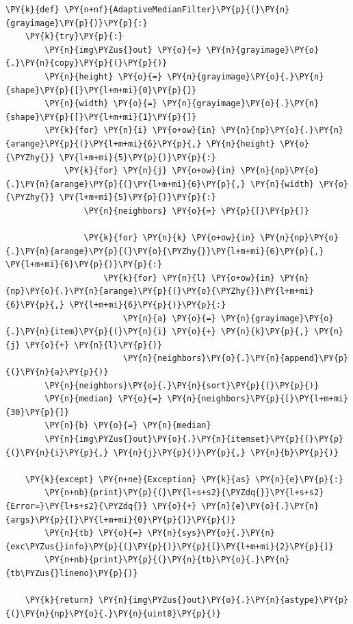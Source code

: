 \begin{tcolorbox}[breakable, size=fbox, boxrule=1pt, pad at break*=1mm,colback=cellbackground, colframe=cellborder]
	\begin{Verbatim}[commandchars=\\\{\}]
\PY{k}{def} \PY{n+nf}{AdaptiveMedianFilter}\PY{p}{(}\PY{n}{grayimage}\PY{p}{)}\PY{p}{:}
    \PY{k}{try}\PY{p}{:}
        \PY{n}{img\PYZus{}out} \PY{o}{=} \PY{n}{grayimage}\PY{o}{.}\PY{n}{copy}\PY{p}{(}\PY{p}{)}
        \PY{n}{height} \PY{o}{=} \PY{n}{grayimage}\PY{o}{.}\PY{n}{shape}\PY{p}{[}\PY{l+m+mi}{0}\PY{p}{]}
        \PY{n}{width} \PY{o}{=} \PY{n}{grayimage}\PY{o}{.}\PY{n}{shape}\PY{p}{[}\PY{l+m+mi}{1}\PY{p}{]}
        \PY{k}{for} \PY{n}{i} \PY{o+ow}{in} \PY{n}{np}\PY{o}{.}\PY{n}{arange}\PY{p}{(}\PY{l+m+mi}{6}\PY{p}{,} \PY{n}{height} \PY{o}{\PYZhy{}} \PY{l+m+mi}{5}\PY{p}{)}\PY{p}{:}
            \PY{k}{for} \PY{n}{j} \PY{o+ow}{in} \PY{n}{np}\PY{o}{.}\PY{n}{arange}\PY{p}{(}\PY{l+m+mi}{6}\PY{p}{,} \PY{n}{width} \PY{o}{\PYZhy{}} \PY{l+m+mi}{5}\PY{p}{)}\PY{p}{:}
                \PY{n}{neighbors} \PY{o}{=} \PY{p}{[}\PY{p}{]}
		
                \PY{k}{for} \PY{n}{k} \PY{o+ow}{in} \PY{n}{np}\PY{o}{.}\PY{n}{arange}\PY{p}{(}\PY{o}{\PYZhy{}}\PY{l+m+mi}{6}\PY{p}{,} \PY{l+m+mi}{6}\PY{p}{)}\PY{p}{:}
                    \PY{k}{for} \PY{n}{l} \PY{o+ow}{in} \PY{n}{np}\PY{o}{.}\PY{n}{arange}\PY{p}{(}\PY{o}{\PYZhy{}}\PY{l+m+mi}{6}\PY{p}{,} \PY{l+m+mi}{6}\PY{p}{)}\PY{p}{:}
                        \PY{n}{a} \PY{o}{=} \PY{n}{grayimage}\PY{o}{.}\PY{n}{item}\PY{p}{(}\PY{n}{i} \PY{o}{+} \PY{n}{k}\PY{p}{,} \PY{n}{j} \PY{o}{+} \PY{n}{l}\PY{p}{)}
                        \PY{n}{neighbors}\PY{o}{.}\PY{n}{append}\PY{p}{(}\PY{n}{a}\PY{p}{)}
        \PY{n}{neighbors}\PY{o}{.}\PY{n}{sort}\PY{p}{(}\PY{p}{)}
        \PY{n}{median} \PY{o}{=} \PY{n}{neighbors}\PY{p}{[}\PY{l+m+mi}{30}\PY{p}{]}
        \PY{n}{b} \PY{o}{=} \PY{n}{median}
        \PY{n}{img\PYZus{}out}\PY{o}{.}\PY{n}{itemset}\PY{p}{(}\PY{p}{(}\PY{n}{i}\PY{p}{,} \PY{n}{j}\PY{p}{)}\PY{p}{,} \PY{n}{b}\PY{p}{)}
		
    \PY{k}{except} \PY{n+ne}{Exception} \PY{k}{as} \PY{n}{e}\PY{p}{:}
        \PY{n+nb}{print}\PY{p}{(}\PY{l+s+s2}{\PYZdq{}}\PY{l+s+s2}{Error=}\PY{l+s+s2}{\PYZdq{}} \PY{o}{+} \PY{n}{e}\PY{o}{.}\PY{n}{args}\PY{p}{[}\PY{l+m+mi}{0}\PY{p}{]}\PY{p}{)}
        \PY{n}{tb} \PY{o}{=} \PY{n}{sys}\PY{o}{.}\PY{n}{exc\PYZus{}info}\PY{p}{(}\PY{p}{)}\PY{p}{[}\PY{l+m+mi}{2}\PY{p}{]}
		\PY{n+nb}{print}\PY{p}{(}\PY{n}{tb}\PY{o}{.}\PY{n}{tb\PYZus{}lineno}\PY{p}{)}
		
    \PY{k}{return} \PY{n}{img\PYZus{}out}\PY{o}{.}\PY{n}{astype}\PY{p}{(}\PY{n}{np}\PY{o}{.}\PY{n}{uint8}\PY{p}{)}
	\end{Verbatim}
\end{tcolorbox}


